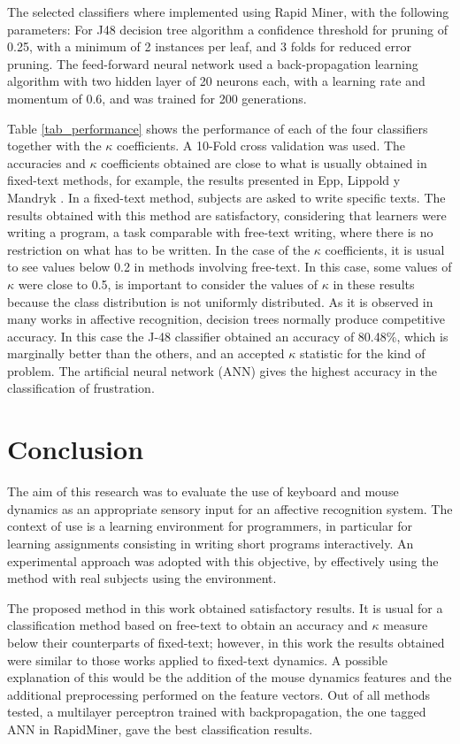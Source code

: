 \documentclass[a4paper,twoside]{article}
\begin{document}
The selected classifiers where implemented using Rapid Miner, with the
following parameters: For J48 decision tree algorithm a confidence threshold
for pruning of 0.25, with a minimum of 2 instances per leaf, and 3 folds for
reduced error pruning. The feed-forward neural network used a back-propagation
learning algorithm with two hidden layer of 20 neurons each, with a learning
rate and momentum of 0.6, and was trained for 200 generations.

Table \ref{tab_performance} shows the performance of each of the four
classifiers together
with the $\kappa$ coefficients. A 10-Fold cross validation was used.
The accuracies and $\kappa$ coefficients obtained are close to what is
usually obtained in fixed-text methods, for example, the results presented in
Epp, Lippold y Mandryk \cite{epp2011identifying}.
In a fixed-text method, subjects are asked to write specific texts.
The results obtained with this method are satisfactory, considering that
learners were writing a program, a task comparable with free-text writing,
where there is no restriction on what has to be written.
In the case of the $\kappa$ coefficients, it is
usual to see values below 0.2 in methods involving free-text. In this case, some
values of $\kappa$ were close to 0.5, is important to consider the values of $\kappa$
in these results because the class distribution is not uniformly distributed. As
it is observed in many works in affective recognition, decision trees normally
produce competitive accuracy. In this case the J-48 classifier obtained an
accuracy of 80.48\%, which is marginally better than the others, and an accepted $\kappa$
statistic for the kind of problem. The artificial neural network (ANN)
gives the highest
accuracy in the classification of frustration.


\section{Conclusion}

The aim of this research was to evaluate the use of keyboard and mouse dynamics
as an appropriate sensory input for an affective recognition system. The context
of use is a learning environment for programmers, in particular for learning
assignments consisting in writing short programs interactively. An experimental
approach was adopted with this objective, by effectively using the
method with real subjects using the environment.

The proposed method in this work obtained
satisfactory results. It is usual for a classification method based on free-text
to obtain an accuracy and $\kappa$ measure below their counterparts of
fixed-text; however, in this
work the results obtained were similar to those works applied to fixed-text
dynamics. A possible explanation of this would be the addition of the mouse
dynamics features and the additional preprocessing performed on the
feature vectors. Out of all methods tested, a multilayer perceptron
trained with backpropagation, the one tagged ANN in RapidMiner,  gave the best classification
results.
\end{document}
